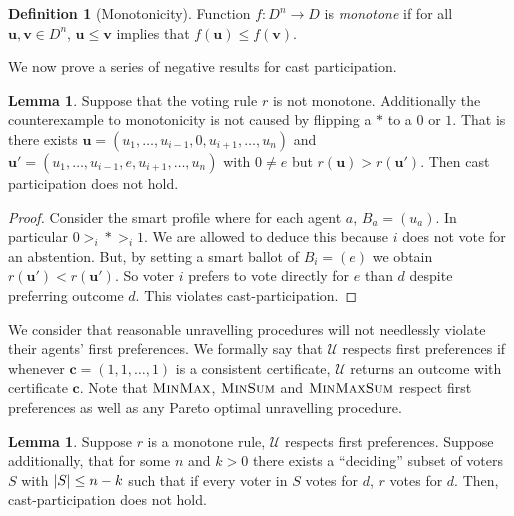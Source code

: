 \documentclass[11pt,a4paper, titlepage]{article}
\DeclarePairedDelimiter\abs{\lvert}{\rvert}
\theoremstyle{definition}
\newtheorem{definition}[theorem]{Definition}
\newtheorem{lemma}[theorem]{Lemma}
\let\vec\mathbf
\begin{document}
\begin{definition}[Monotonicity]
    Function $f\colon D^n \longrightarrow D$ is \emph{monotone} if for all $\vec{u}, \vec{v} \in D^n$, $\vec{u} \leq \vec{v}$ implies that $f(\vec{u}) \leq f(\vec{v})$.
\end{definition}

We now prove a series of negative results for cast participation.



\begin{lemma} Suppose that the voting rule $r$ is not monotone. Additionally the counterexample to monotonicity is not caused by flipping a $*$ to a $0$ or $1$. 
That is there exists $\vec{u} = (u_1, \ldots, u_{i-1}, 0, u_{i+1}, \ldots, u_n)$ and $\vec{u}' = (u_1, \ldots, u_{i-1}, e, u_{i+1}, \ldots, u_n)$ with $0 \neq e$ but $r(\vec{u}) > r(\vec{u}')$. 
Then cast participation does not hold.
\end{lemma}

\begin{proof}
    Consider the smart profile where for each agent $a$, $B_a = (u_a)$. 
    In particular $0 >_i * >_i 1$. We are allowed to deduce this because $i$ does not vote for an abstention.
    But, by setting a smart ballot of $B_i = (e)$ we obtain $r(\vec{u}') < r(\vec{u}')$. So voter $i$ prefers to vote directly for $e$ than $d$ despite preferring outcome $d$.
    This violates cast-participation.
\end{proof}

We consider that reasonable unravelling procedures will not needlessly violate their agents' first preferences. 
We formally say that $\mathcal{U}$ respects first preferences if whenever $\vec{c} = (1, 1, \ldots, 1)$ is a consistent certificate, $\mathcal{U}$ returns an outcome with certificate $\vec{c}$. 
Note that $\textsc{MinMax}$, $\textsc{MinSum}$ and $\textsc{MinMaxSum}$ respect first preferences as well as any Pareto optimal unravelling procedure.

\begin{lemma}
    Suppose $r$ is a monotone rule, $\mathcal{U}$ respects first preferences. Suppose additionally, that for some $n$ and $k > 0$ there exists a ``deciding'' subset of voters $S$ with $\abs{S} \leq n - k$ such that if every voter in $S$ votes for $d$, $r$ votes for $d$.
    Then, cast-participation does not hold.
\end{lemma}
\end{document}
